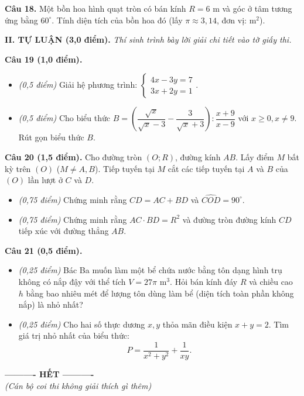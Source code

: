 \documentclass[11pt,a4paper]{article}
\begin{document}
\vspace{1.5mm}
\textbf{Câu 18.} Một bồn hoa hình quạt tròn có bán kính $R = 6\text{ m}$ và góc ở tâm tương ứng bằng $60^\circ$. Tính diện tích của bồn hoa đó (lấy $\pi \approx 3{,}14$, đơn vị: $\text{m}^2$).

\vspace{4mm}
\noindent
\textbf{\large II. TỰ LUẬN (3,0 điểm).} \textit{Thí sinh trình bày lời giải chi tiết vào tờ giấy thi.}

\vspace{2mm}
\textbf{Câu 19 (1,0 điểm).}
\begin{itemize}
  \item[a)] \textit{(0,5 điểm)} Giải hệ phương trình: $\begin{cases} 4x - 3y = 7 \\ 3x + 2y = 1 \end{cases}$.
  \item[b)] \textit{(0,5 điểm)} Cho biểu thức $B = \left( \dfrac{\sqrt{x}}{\sqrt{x}-3} - \dfrac{3}{\sqrt{x}+3} \right) : \dfrac{x+9}{x-9}$ với $x \ge 0, x \ne 9$. Rút gọn biểu thức $B$.
\end{itemize}

\vspace{2mm}
\textbf{Câu 20 (1,5 điểm).} Cho đường tròn $(O; R)$, đường kính $AB$. Lấy điểm $M$ bất kỳ trên $(O)$ ($M \ne A, B$). Tiếp tuyến tại $M$ cắt các tiếp tuyến tại $A$ và $B$ của $(O)$ lần lượt ở $C$ và $D$.
\begin{itemize}
  \item[a)] \textit{(0,75 điểm)} Chứng minh rằng $CD = AC + BD$ và $\widehat{COD} = 90^\circ$.
  \item[b)] \textit{(0,75 điểm)} Chứng minh rằng $AC \cdot BD = R^2$ và đường tròn đường kính $CD$ tiếp xúc với đường thẳng $AB$.
\end{itemize}

\vspace{2mm}
\textbf{Câu 21 (0,5 điểm).}
\begin{itemize}
  \item[a)] \textit{(0,25 điểm)} Bác Ba muốn làm một bể chứa nước bằng tôn dạng hình trụ không có nắp đậy với thể tích $V = 27\pi\text{ m}^3$. Hỏi bán kính đáy $R$ và chiều cao $h$ bằng bao nhiêu mét để lượng tôn dùng làm bể (diện tích toàn phần không nắp) là nhỏ nhất?
  \item[b)] \textit{(0,25 điểm)} Cho hai số thực dương $x, y$ thỏa mãn điều kiện $x + y = 2$. Tìm giá trị nhỏ nhất của biểu thức:
  \[
  P = \dfrac{1}{x^2 + y^2} + \dfrac{1}{xy}.
  \]
\end{itemize}

\vspace{4mm}
\begin{center}
\textbf{---------- HẾT ----------}\\
\textit{(Cán bộ coi thi không giải thích gì thêm)}
\end{center}
\end{document}
